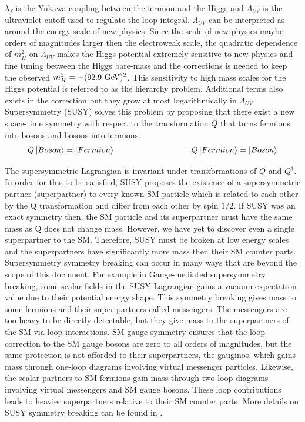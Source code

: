 \indent $\lambda_f$ is the Yukawa coupling between the fermion and the Higgs and $\Lambda_{UV}$ is the ultraviolet cutoff used to regulate the loop integral.  $\Lambda_{UV}$ can be interpreted as around the energy scale of new physics.  Since the scale of new physics maybe orders of magnitudes larger then the electroweak scale, the quadratic dependence of $m_H^2$ on $\Lambda_{UV}$ makes the Higgs potential extremely sensitive to new physics and fine tuning between the Higgs bare-mass and the corrections is needed to keep the observed $m_H^2 = -(92.9 \gev)^2$.  This sensitivity to high mass scales for the Higgs potential is referred to as the hierarchy problem.  Additional terms also exists in the correction but they grow at most logarithmically in $\Lambda_{UV}$. \\

\indent Supersymmetry (SUSY) solves this problem by proposing that there exist a new space-time symmetry with respect to the transformation $Q$ that turns fermions into bosons and bosons into fermions.\\

\begin{equation}
\label{eqn:Higgs:Loopf}
Q\ket{Boson} = \ket{Fermion} ~~~~~~~~~~~~~~~~~~~~~~~~~~~~ Q\ket{Fermion} = \ket{Boson}
\end{equation}

\indent The supersymmetric Lagrangian is invariant under transformations of $Q$ and $Q^{\dagger}$.  In order for this to be satisfied, SUSY proposes the existence of a supersymmetric partner (superpartner) to every known SM particle which is related to each other by the Q transformation and differ from each other by spin $1/2$.  If SUSY was an exact symmetry then, the SM particle and its superpartner must have the same mass as Q does not change mass.  However, we have yet to discover even a single superpartner to the SM.  Therefore, SUSY must be broken at low energy scales and the superpartners have significantly more mass then their SM counter parts.  \\

\indent Supersymmetry symmetry breaking can occur in many ways that are beyond the scope of this document.  For example in Gauge-mediated supersymmetry breaking, some scalar fields in the SUSY Lagrangian gains a vacuum expectation value due to their potential energy shape.  This symmetry breaking gives mass to some fermions and their super-partners called messengers.  The messengers are too heavy to be directly detectable, but they give mass to the superpartners of the SM via loop interactions.  SM gauge symmetry ensures that the loop correction to the SM gauge bosons are zero to all orders of magnitudes, but the same protection is not afforded to their superpartners, the gauginos, which gains mass through one-loop diagrams involving virtual messenger particles.  Likewise, the scalar partners to SM fermions gain mass through two-loop diagrams involving virtual messengers and SM gauge bosons.  These loop contributions leads to heavier superpartners relative to their SM counter parts.  More details on SUSY symmetry breaking can be found in \cite{MartinSUSY}. \\

